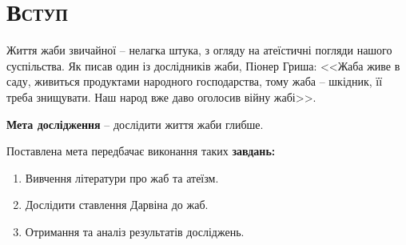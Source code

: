

\newpage
\chapter*{\textsc{Вступ}}

Життя жаби звичайної -- нелагка штука, з огляду на атеїстичні погляди нашого суспільства. Як писав один із дослідників жаби, Піонер Гриша: <<Жаба живе в саду, живиться продуктами народного господарства, тому жаба – шкідник, її треба знищувати. Наш народ вже даво оголосив війну жабі>>.
 
\textbf{Мета дослідження} -- дослідити життя жаби глибше.

Поставлена мета передбачає виконання таких \textbf{завдань:}

\begin{enumerate}
	\item Вивчення літератури про жаб та атеїзм.
	\item Дослідити ставлення Дарвіна до жаб.
	\item Отримання та аналіз результатів досліджень.
\end{enumerate}